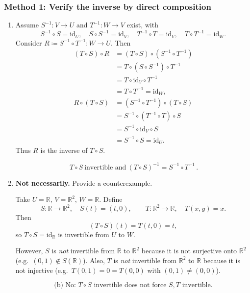 \documentclass[12pt]{article}
\newcommand{\R}{\mathbb{R}}
\begin{document}
\subsubsection{Method 1: Verify the inverse by direct composition}
\begin{enumerate}[label=(\alph*)]
\item Assume $S^{-1}:V\to U$ and $T^{-1}:W\to V$ exist, with
\[
S^{-1}\circ S=\mathrm{id}_U,\quad S\circ S^{-1}=\mathrm{id}_V,\quad
T^{-1}\circ T=\mathrm{id}_V,\quad T\circ T^{-1}=\mathrm{id}_W.
\]
Consider $R\coloneqq S^{-1}\circ T^{-1}:W\to U$. Then
\begin{align*}
(T\circ S)\circ R
&=(T\circ S)\circ (S^{-1}\circ T^{-1})\\
&= T\circ (S\circ S^{-1})\circ T^{-1}\\
&= T\circ \mathrm{id}_V \circ T^{-1}\\
&= T\circ T^{-1}=\mathrm{id}_W,\\
R\circ (T\circ S)
&=(S^{-1}\circ T^{-1})\circ (T\circ S)\\
&= S^{-1}\circ (T^{-1}\circ T)\circ S\\
&= S^{-1}\circ \mathrm{id}_V \circ S\\
&= S^{-1}\circ S=\mathrm{id}_U.
\end{align*}
Thus $R$ is the inverse of $T\circ S$.

\[
\boxed{\,T\circ S\ \text{invertible and}\ (T\circ S)^{-1}=S^{-1}\circ T^{-1}\,}.
\]

\item \textbf{Not necessarily.} Provide a counterexample.

Take $U=\R$, $V=\R^2$, $W=\R$. Define
\[
S:\R\to\R^2,\quad S(t)=(t,0),\qquad
T:\R^2\to\R,\quad T(x,y)=x.
\]
Then
\[
(T\circ S)(t)=T(t,0)=t,
\]
so $T\circ S=\mathrm{id}_{\R}$ is invertible from $U$ to $W$.

However, $S$ is \emph{not} invertible from $\R$ to $\R^2$ because it is not surjective onto $\R^2$ (e.g.\ $(0,1)\notin S(\R)$).
Also, $T$ is \emph{not} invertible from $\R^2$ to $\R$ because it is not injective (e.g.\ $T(0,1)=0=T(0,0)$ with $(0,1)\neq(0,0)$).

\[
\boxed{\,\text{(b) No: }T\circ S\text{ invertible does not force }S,T\text{ invertible.}\,}
\]
\end{enumerate}
\end{document}
